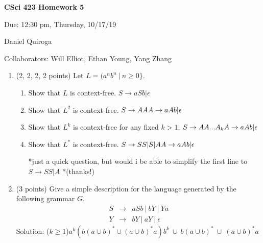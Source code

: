 \documentclass[11pt]{article}
\begin{document}
\begin{LARGE}
\centerline {\bf CSci 423 Homework 5}
\end{LARGE}
\vskip 0.25cm

\centerline{Due: 12:30 pm, Thursday, 10/17/19}
\centerline{Daniel Quiroga}

Collaborators: Will Elliot, Ethan Young, Yang Zhang

\begin{enumerate}
\item (2, 2, 2, 2 points) Let $L=(a^nb^n\ |\ n\ge0\}$.
\begin{enumerate}
\item Show that $L$ is context-free. \newline 
$S \rightarrow aSb | \epsilon$
\item Show that $L^2$ is context-free.\newline 
$S \rightarrow AA\newline 
A \rightarrow aAb | \epsilon $
\item Show that $L^k$ is context-free for any fixed $k>1$. \newline 
$S \rightarrow AA...A_k\newline 
A \rightarrow a A b| \epsilon $
\item Show that $L^*$ is context-free.\newline 
$S \rightarrow  SS |S| A \newline 
A \rightarrow aAb | \epsilon$\newline 

*just a quick question, but would i be able to simplify the first line to $S \rightarrow SS|A$ *(thanks!)
\end{enumerate}

\item (3 points)  Give a simple description for the language generated by the following grammar $G$.
\begin{eqnarray*}
S&\rightarrow& aSb\ |\ bY\ | \ Ya\\
Y&\rightarrow& bY\ |\ aY\ |\ \epsilon
\end{eqnarray*}
Solution:\newline 
($k\ge1$)$a^k (b (a\cup b)^* \cup (a\cup b)^*a)b^k\  \cup \ b(a\cup b)^*\  \cup \ (a\cup b)^*a$


\end{enumerate}
\end{document}
